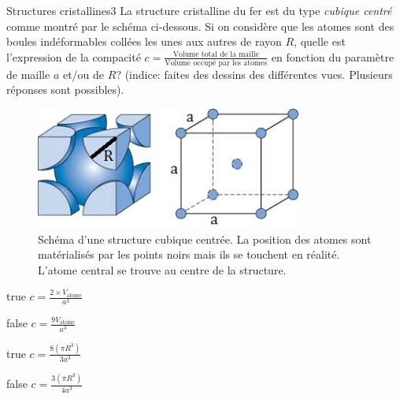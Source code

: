 \documentclass[11pt]{article}
\begin{document}
        \begin{question}{31}{Structures cristallines}{3}{}
            La structure cristalline du fer est du type \emph{cubique centré} comme montré par le schéma ci-dessous. Si on considère que les atomes sont des boules indéformables collées les unes aux autres de rayon $R$, quelle est l'expression de la compacité $c = \frac{\text{Volume total de la maille}}{\text{Volume occupé par les atomes}}$ en fonction du paramètre de maille $a$ et/ou de $R$? (indice: faites des dessins des différentes vues. Plusieurs réponses sont possibles).
            \begin{figure}
                \centering
                \includegraphics[height = 4cm]{Antoine/Figures_Antoine/BCC.png}
                \caption{Schéma d'une structure cubique centrée. La position des atomes sont matérialisés par les points noirs mais ils se touchent en réalité. L'atome central se trouve au centre de la structure.}
            \end{figure}
        \end{question}
        \begin{reponses} 
            \item[true] $c = \frac{2\times V_\text{atome}}{a^3}$
            \item[false] $c = \frac{9V_\text{atome}}{a^3}$
            \item[true] $c = \frac{8(\pi R^3)}{3a^3}$
    	    \item[false] $c = \frac{3(\pi R^3)}{4a^3}$
        \end{reponses}
        
\end{document}
